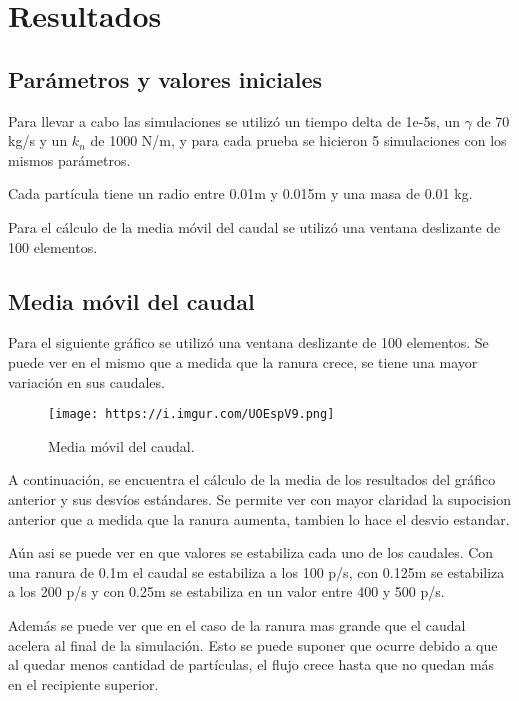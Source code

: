 \documentclass{article}
\begin{document}
\section{Resultados}

\subsection{Parámetros y valores iniciales}

Para llevar a cabo las simulaciones se utilizó un tiempo delta de 1e-5s, un \begin{math}\gamma\end{math} de 70 kg/s y un \begin{math}k_n\end{math} de 1000 N/m, y para cada prueba se hicieron 5 simulaciones con los mismos parámetros.

Cada partícula tiene un radio entre 0.01m y 0.015m y una masa de 0.01 kg.

Para el cálculo de la media móvil del caudal se utilizó una ventana deslizante de 100 elementos.

\subsection{Media móvil del caudal}
Para el siguiente gráfico se utilizó una ventana deslizante de 100 elementos. Se puede ver en el mismo que a medida que la ranura crece, se tiene una mayor variación en sus caudales.

\begin{figure}[!h]
  \centerline{\texttt{[image: https://i.imgur.com/UOEspV9.png]}}
  \caption{Media móvil del caudal.}
  \label{fig:boat1}
\end{figure}

A continuación, se encuentra el cálculo de la media de los resultados del gráfico anterior y sus desvíos estándares. Se permite ver con mayor claridad la supocision anterior que a medida que la ranura aumenta, tambien lo hace el desvio estandar.\endgraf

Aún asi se puede ver en que valores se estabiliza cada uno de los caudales. Con una ranura de 0.1m el caudal se estabiliza a los 100 p/s, con 0.125m se estabiliza a los 200 p/s y con 0.25m se estabiliza en un valor entre 400 y 500 p/s.\endgraf

Además se puede ver que en el caso de la ranura mas grande que el caudal acelera al final de la simulación. Esto se puede suponer que ocurre debido a que al quedar menos cantidad de partículas, el flujo crece hasta que no quedan más en el recipiente superior. 
\end{document}
